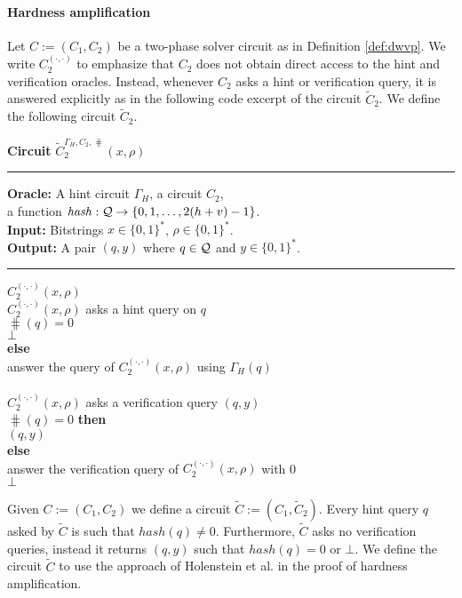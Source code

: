 \paragraph{Hardness amplification}%
Let $C := (C_1, C_2)$ be a two-phase solver circuit as in Definition \ref{def:dwvp}.
We write $C_2^{(\cdot, \cdot)}$ to emphasize that $C_2$ does not obtain direct access to the hint and verification oracles.
Instead, whenever $C_2$ asks a hint or verification query, it is answered explicitly
as in the following code excerpt of the circuit $\widetilde{C}_2$.
We define the following circuit $\widetilde{C}_2$.
\begin{codeblock}
  \textbf{Circuit} $\widetilde{C}_2^{\Gamma_H, C_2, \hash} (x, \rho)$
  \medskip \hrule
  \textbf{Oracle:} A hint circuit $\Gamma_H$, a circuit $C_2$, \\ \IndII a function $\operatorname{\mathit{hash}} : \mathcal{Q} \rightarrow \{0,1,\dots, 2(h+v)-1\}$. \\
  \textbf{Input:} Bitstrings $x \in \{0,1\}^{*}$, $\rho \in \{0,1\}^{*}$. \\
  \textbf{Output:} A pair $(q, y)$ where $q \in \mathcal{Q}$ and $y \in \{0,1\}^{*}$.
  \medskip\hrule
  \Run $C_2^{(\cdot, \cdot)}(x, \rho)$ \\
  \IndI \If $C_2^{(\cdot, \cdot)}(x, \rho)$ asks a hint query on $q$ \Then\\
  \IndII \If $\hash(q) = 0$ \Then\\
  \IndIII \Return $\bot$\\
  \IndII \textbf{else}\\
  \IndIII answer the query of $C_2^{(\cdot, \cdot)}(x, \rho)$ using $\Gamma_H(q)$\\
  \\
  \IndI \If $C_2^{(\cdot, \cdot)}(x, \rho)$ asks a verification query $(q, y)$ \Then \\
  \IndII \If $\hash(q) = 0 $ \textbf{then} \\
  \IndIII \Return $(q, y)$ \\
  \IndII \textbf{else} \\
  \IndIII answer the verification query of $C_2^{(\cdot, \cdot)}(x, \rho)$ with 0 \\
  \Return $\bot$
\end{codeblock}
%
Given $C := (C_1, C_2)$ we define a circuit $\widetilde{C} := (C_1, \widetilde{C}_2)$.
Every hint query $q$ asked by $\widetilde{C}$ is such that $hash(q) \neq 0$. Furthermore, $\widetilde{C}$ asks no verification queries,
instead it returns $(q,y)$ such that $hash(q) = 0$ or $\bot$.
We define the circuit $\widetilde{C}$ to use the approach of Holenstein et al. \cite{holenstein2011general} in the proof of hardness amplification.
